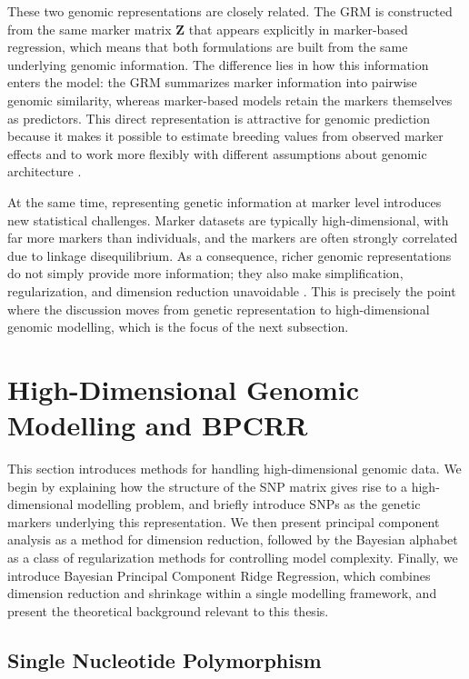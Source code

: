 These two genomic representations are closely related. The GRM is constructed from the same marker matrix $\mathbf{Z}$ that appears explicitly in marker-based regression, which means that both formulations are built from the same underlying genomic information. %
The difference lies in how this information enters the model: the GRM summarizes marker information into pairwise genomic similarity, whereas marker-based models retain the markers themselves as predictors. %
This direct representation is attractive for genomic prediction because it makes it possible to estimate breeding values from observed marker effects and to work more flexibly with different assumptions about genomic architecture \parencite{meuwissen_prediction_2001, aspheim_bayesian_2024}. %

At the same time, representing genetic information at marker level introduces new statistical challenges. Marker datasets are typically high-dimensional, with far more markers than individuals, and the markers are often strongly correlated due to linkage disequilibrium. %
As a consequence, richer genomic representations do not simply provide more information; they also make simplification, regularization, and dimension reduction unavoidable \parencite{aspheim_bayesian_2024, gianola_priors_2013}. %
This is precisely the point where the discussion moves from genetic representation to high-dimensional genomic modelling, which is the focus of the next subsection.

\section{High-Dimensional Genomic Modelling and BPCRR}

This section introduces methods for handling high-dimensional genomic data. We begin by explaining how the structure of the SNP matrix gives rise to a high-dimensional modelling problem, and briefly introduce SNPs as the genetic markers underlying this representation. We then present principal component analysis as a method for dimension reduction, followed by the Bayesian alphabet as a class of regularization methods for controlling model complexity. Finally, we introduce Bayesian Principal Component Ridge Regression, which combines dimension reduction and shrinkage within a single modelling framework, and present the theoretical background relevant to this thesis.

\subsection{Single Nucleotide Polymorphism}


